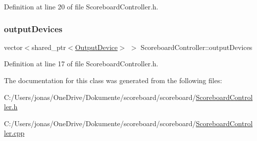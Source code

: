 Definition at line 20 of file Scoreboard\+Controller.\+h.

\mbox{\label{class_scoreboard_controller_a905c2a68cb4b0b769385ebdc13adf595}} 
\subsubsection{\texorpdfstring{output\+Devices}{outputDevices}}
{\footnotesize\ttfamily vector$<$shared\+\_\+ptr$<$\hyperlink{class_output_device}{Output\+Device}$>$ $>$ Scoreboard\+Controller\+::output\+Devices\hspace{0.3cm}{\ttfamily [private]}}



Definition at line 17 of file Scoreboard\+Controller.\+h.



The documentation for this class was generated from the following files\+:\begin{DoxyCompactItemize}
\item 
C\+:/\+Users/jonas/\+One\+Drive/\+Dokumente/scoreboard/scoreboard/\hyperlink{_scoreboard_controller_8h}{Scoreboard\+Controller.\+h}\item 
C\+:/\+Users/jonas/\+One\+Drive/\+Dokumente/scoreboard/scoreboard/\hyperlink{_scoreboard_controller_8cpp}{Scoreboard\+Controller.\+cpp}\end{DoxyCompactItemize}
